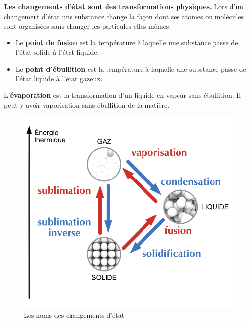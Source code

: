 \documentclass[
  11pt,
  a4paper,
  openany]{book}
\providecommand{\tightlist}{%
  \setlength{\itemsep}{0pt}\setlength{\parskip}{0pt}}
\begin{document}
\textbf{Les changements d'état sont des transformations physiques.} Lors d'un changement d'état une substance change la façon dont ses atomes ou molécules sont organisées sans changer les particules elles-mêmes.

\begin{itemize}
\tightlist
\item
  Le \textbf{point de fusion} est la température à laquelle une substance passe de l'état solide à l'état liquide.
\item
  Le \textbf{point d'ébullition} est la température à laquelle une substance passe de l'état liquide à l'état gazeux.
\end{itemize}

L'\textbf{évaporation} est la transformation d'un liquide en vapeur sans ébullition. Il peut y avoir vaporisation sans ébullition de la matière.

\newpage

\begin{figure}

{\centering \includegraphics[width=0.45\linewidth]{images/chgt-etats} 

}

\caption{Les noms des changements d'état}\label{fig:chgt-etats}
\end{figure}
\end{document}
